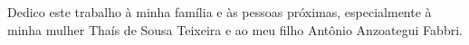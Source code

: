 Dedico este trabalho à minha família e às pessoas próximas, especialmente
à minha mulher Thaís de Sousa Teixeira e ao meu filho Antônio Anzoategui Fabbri.